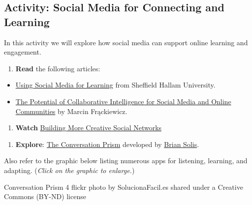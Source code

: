 \documentclass[
]{book}
\providecommand{\tightlist}{%
  \setlength{\itemsep}{0pt}\setlength{\parskip}{0pt}}
\theoremstyle{definition}
\theoremstyle{definition}
\theoremstyle{definition}
\theoremstyle{definition}
\theoremstyle{remark}
\begin{document}
\hypertarget{activity-social-media-for-connecting-and-learning}{%
\subsection*{Activity: Social Media for Connecting and Learning}\label{activity-social-media-for-connecting-and-learning}}

\begin{reflect}
In this activity we will explore how social media can support online learning and engagement.

\begin{enumerate}
\def\labelenumi{\arabic{enumi}.}
\tightlist
\item
  \textbf{Read} the following articles:
\end{enumerate}

\begin{itemize}
\tightlist
\item
  \href{https://www.shu.ac.uk/digital-skills/personal/social-media-for-learning}{Using Social Media for Learning} from Sheffield Hallam University.\\
\item
  \href{https://ts2.space/en/the-potential-of-collaborative-intelligence-for-social-media-and-online-communities/}{The Potential of Collaborative Intelligence for Social Media and Online Communities} by Marcin Frąckiewicz.
\end{itemize}

\begin{enumerate}
\def\labelenumi{\arabic{enumi}.}
\setcounter{enumi}{1}
\tightlist
\item
  \textbf{Watch} \href{https://www.youtube.com/watch?v=Acc4zY1sQ0o}{Building More Creative Social Networks}
\end{enumerate}

\begin{enumerate}
\def\labelenumi{\arabic{enumi}.}
\setcounter{enumi}{1}
\tightlist
\item
  \textbf{Explore}: \href{https://www.briansolis.com/2008/08/introducing-conversation-prism-html/}{The Conversation Prism} developed by \href{https://www.briansolis.com/about/}{Brian Solis}.
\end{enumerate}

Also refer to the graphic below listing numerous apps for listening, learning, and adapting. (\emph{Click on the graphic to enlarge.})

Conversation Prism 4 flickr photo by SolucionaFacil.es shared under a Creative Commons (BY-ND) license
\end{reflect}
\end{document}
